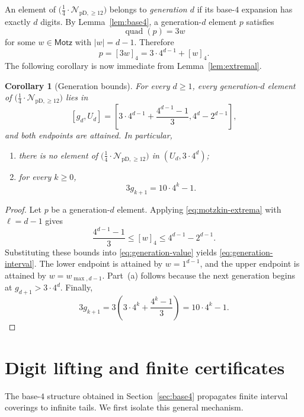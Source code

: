 \documentclass[12pt]{article}
\theoremstyle{plain}
\newtheorem{corollary}[theorem]{Corollary}
\theoremstyle{definition}
\theoremstyle{plain}
\newcommand{\Pset}{%
  \bigl(\tfrac{1}{4}\cdot\mathcal{N}_{\mathrm{pD},\geq 12}\bigr)%
}
\begin{document}
An element of $\Pset$ belongs to \emph{generation $d$} if its base-$4$
expansion has exactly $d$ digits.  By Lemma~\ref{lem:base4}, a
generation-$d$ element $p$ satisfies
\[
 \operatorname{quad}(p)=3w
\]
for some $w\in\mathsf{Motz}$ with $|w|=d-1$.  Therefore
\begin{equation}\label{eq:generation-value}
 p=[3w]_4=3\cdot4^{d-1}+[w]_4.
\end{equation}
The following corollary is now immediate from Lemma~\ref{lem:extremal}.

\begin{corollary}[Generation bounds]\label{cor:gen}
For every $d\geq1$, every generation-$d$ element of $\Pset$ lies in
\begin{equation}\label{eq:generation-interval}
  [g_d,U_d]
  =\left[
  3\cdot4^{d-1}+\frac{4^{d-1}-1}{3},
  4^d-2^{d-1}
  \right],
\end{equation}
and both endpoints are attained.  In particular,
\begin{enumerate}[label=\textup{(\alph*)}]
\item there is no element of $\Pset$ in $(U_d,3\cdot4^d)$;
\item for every $k\geq0$,
\begin{equation}\label{eq:three-g}
  3g_{k+1}=10\cdot4^k-1.
\end{equation}
\end{enumerate}
\end{corollary}

\begin{proof}
Let $p$ be a generation-$d$ element.  Applying
\eqref{eq:motzkin-extrema} with $\ell=d-1$ gives
\[
 \frac{4^{d-1}-1}{3}
 \leq[w]_4
 \leq4^{d-1}-2^{d-1}.
\]
Substituting these bounds into \eqref{eq:generation-value} yields
\eqref{eq:generation-interval}.  The lower
endpoint is attained by $w=1^{d-1}$, and the upper endpoint is attained by
$w=w_{\max,d-1}$.  Part~(a) follows because the next generation begins at
$g_{d+1}>3\cdot4^d$.  Finally,
\[
  3g_{k+1}
  =3\left(3\cdot4^k+\frac{4^k-1}{3}\right)
  =10\cdot4^k-1.
\]
\end{proof}


\section{Digit lifting and finite certificates}\label{sec:lifting}

The base-$4$ structure obtained in Section~\ref{sec:base4} propagates
finite interval coverings to infinite tails.  We first isolate this general
mechanism.
\end{document}
